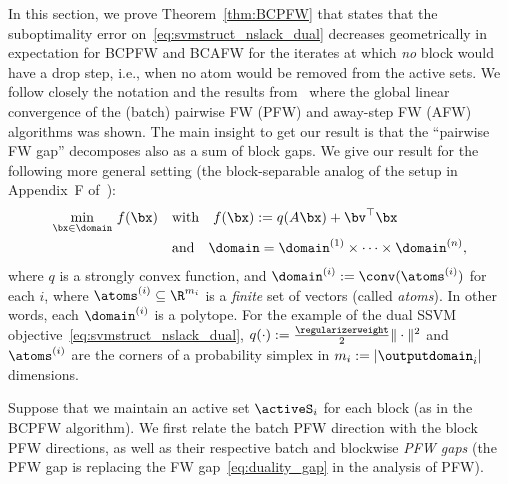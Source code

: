 \documentclass{article}
\begin{document}
In this section, we prove Theorem~\ref{thm:BCPFW} that states that the suboptimality error on~\eqref{eq:svmstruct_nslack_dual} decreases geometrically in expectation for BCPFW and BCAFW for the iterates at which \emph{no} block would have a drop step, i.e., when no atom would be removed from the active sets. We follow closely the notation and the results from~\citet{LacosteJulien2015linearFW} where the global linear convergence of the (batch) pairwise FW (PFW) and away-step FW (AFW) algorithms was shown. The main insight to get our result is that the ``pairwise FW gap'' decomposes also as a sum of block gaps.
We give our result for the following more general setting (the block-separable analog of the setup in Appendix~F of~\citet{LacosteJulien2015linearFW}):
\begin{equation}
\begin{aligned} \label{eq:blockPFWproblem}
\min_{\bx \in \domain} \, f(\bx) \quad 
& \text{with} \quad f(\bx) := q(A \bx) + \bv^\top \bx \\
& \text{and} \quad \domain=\domain^{(1)} \times\dots\times \domain^{(n)},
\end{aligned}
\end{equation}
where $q$ is a strongly convex function, and $\domain^{(i)} := \conv(\atoms^{(i)})$ for each $i$, where $\atoms^{(i)} \subseteq \R^{m_i}$ is a \emph{finite} set of vectors (called \emph{atoms}). In other words, each $\domain^{(i)}$ is a polytope. For the example of the dual SSVM objective~\eqref{eq:svmstruct_nslack_dual}, $q(\cdot) := \frac{\regularizerweight}{2} \| \cdot \|^2$ and $\atoms^{(i)}$ are the corners of a probability simplex in $m_i := |\outputdomain_i|$ dimensions.

Suppose that we maintain an active set $\activeS_i$ for each block (as in the BCPFW algorithm). We first relate the batch PFW direction with the block PFW directions, as well as their respective batch and blockwise \emph{PFW gaps} (the PFW gap is replacing the FW gap~\eqref{eq:duality_gap} in the analysis of PFW).
\end{document}
